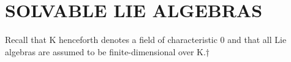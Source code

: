 \section{SOLVABLE LIE ALGEBRAS}

Recall that K henceforth denotes a field of characteristic 0 and that all Lie algebras are assumed to be finite-dimensional over K.†

